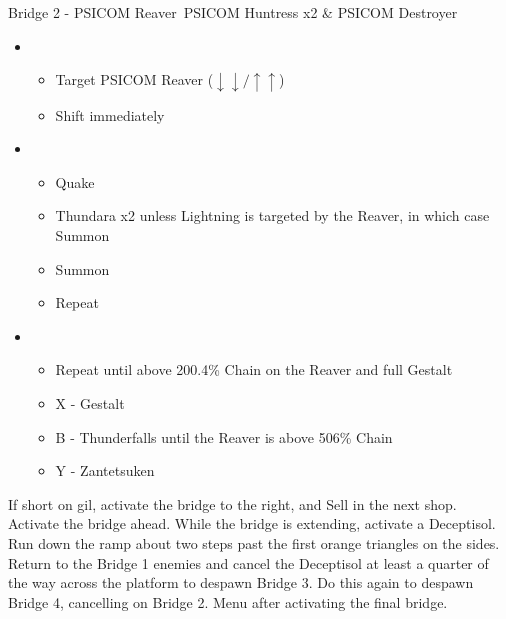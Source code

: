 	\begin{battle}[0:43]{Bridge 2 - PSICOM Reaver\, PSICOM Huntress x2 \& PSICOM Destroyer}%
		\begin{itemize}
			\item \first
			      \begin{itemize}
				      \item Target PSICOM Reaver ($\downarrow\downarrow/\uparrow\uparrow$)
				      \item Shift immediately
			      \end{itemize}
			\item \second
			      \begin{itemize}
				      \item Quake
				      \item Thundara x2 unless Lightning is targeted by the Reaver, in which case Summon
				      \item Summon
				      \item Repeat
			      \end{itemize}
			\item \third
			      \begin{itemize}
				      \item Repeat until above 200.4\% Chain on the Reaver and full Gestalt
				      \item X - Gestalt
				      \item B - Thunderfalls until the Reaver is above 506\% Chain
				      \item Y - Zantetsuken
			      \end{itemize}
		\end{itemize}
		   
	\end{battle}
	If short on gil, activate the bridge to the right, and  Sell in the next shop. Activate the bridge ahead. While the bridge is extending, activate a Deceptisol.  Run down the ramp about two steps past the first orange triangles on the sides. Return to the Bridge 1 enemies and cancel the Deceptisol at least a quarter of the way across the platform to despawn Bridge 3. Do this again to despawn Bridge 4, cancelling on Bridge 2. Menu after activating the final bridge.

